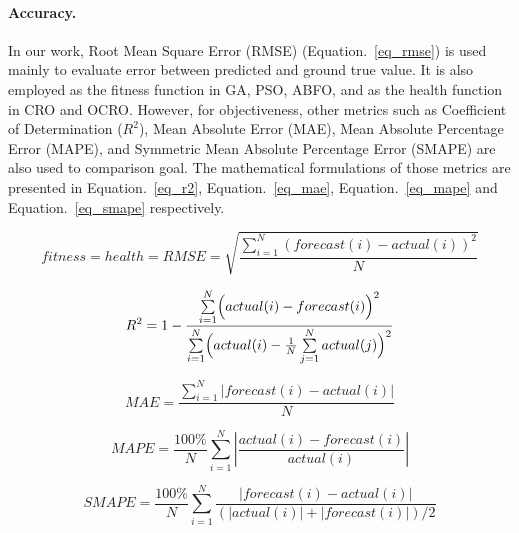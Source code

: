 \documentclass[smallcondensed, natbib]{svjour3}     %
\begin{document}
\paragraph{\textbf{Accuracy.}} In our work, Root Mean Square Error (RMSE) (Equation.~\ref{eq_rmse}) is used mainly to evaluate error between predicted and ground true value. It is also employed as the fitness function in GA, PSO, ABFO, and as the health function in CRO and OCRO. However, for objectiveness, other metrics such as Coefficient of Determination ($R^2$), Mean Absolute Error (MAE), Mean Absolute Percentage Error (MAPE), and Symmetric Mean Absolute Percentage Error (SMAPE) are also used to comparison goal. The mathematical formulations of those metrics are presented in Equation.~\ref{eq_r2}, Equation.~\ref{eq_mae}, Equation.~\ref{eq_mape} and Equation.~\ref{eq_smape} respectively.

 \small

\begin{equation} \label{eq_rmse}
fitness = health = RMSE = \sqrt{ \frac{\sum_{i=1}^N (forecast(i) - actual(i))^2 }{N} }
\end{equation}

\begin{equation} \label{eq_r2}
R^2 = 1 - \displaystyle \frac{ \sum\limits_{i=1}^N \Bigl( actual(i) - forecast(i) \Bigr)^2} { \sum\limits_{i=1}^N \Bigl( actual(i) - \frac{1}{N} \sum\limits_{j=1}^N actual(j) \Bigr)^2  }
\end{equation}

\begin{equation} \label{eq_mae}
MAE = \frac{\sum_{i=1}^N|forecast(i) - actual(i)|}{N}
\end{equation}

\begin{equation} \label{eq_mape}
MAPE = \frac{100\%}{N} \sum_{i=1}^N \left\lvert \frac{actual(i) - forecast(i)}{actual(i)} \right\rvert
\end{equation}

\begin{equation} \label{eq_smape}
SMAPE = \frac{100\%}{N} \sum_{i=1}^N \frac{ |forecast(i) - actual(i)| }{ (|actual(i)| + |forecast(i)|)/2  }
\end{equation}
\normalsize
\end{document}

